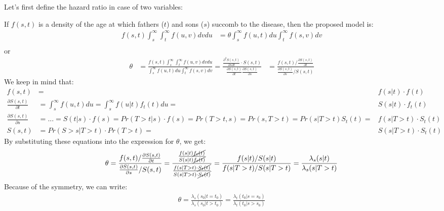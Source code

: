 \documentclass[]{article}
\begin{document}
Let's first define the hazard ratio in case of two variables:


If $f(s,t)$ is a density of the age at which fathers ($t$) and sons ($s$) succomb to the disease, then the proposed model is:
	$$
	\begin{aligned}
		f(s,t)\int_s^{\infty}\int_t^{\infty} f(u, v)dvdu &= \theta \int_s^{\infty}f(u, t)du\int_t^{\infty}f(s, v)dv \\
	\end{aligned}
	$$
		or\\
	$$
	\begin{aligned}
		\theta &= \frac{f(s,t)\int_s^{\infty}\int_t^{\infty} f(u, v)dvdu} {\int_s^{\infty}f(u, t)du\int_t^{\infty}f(s, v)dv} = 
		\frac{ \frac{\partial^2 S(s, t)}{\partial s\partial t} \cdot S(s, t)}    {\frac{\partial S(s, t)}{\partial t} \frac{\partial S(s, t)}{\partial s}}
		&= \frac{f(s,t)/\frac{\partial S(s, t)}{\partial t}}  {\frac{\partial S(s, t)}{\partial s}/ S(s, t) } 
	\end{aligned}
	$$
We keep in mind that:
	$$
	\begin{aligned}
		f(s,t) &= &f(s|t)\cdot f(t)\\
		\frac{\partial S(s,t)}{\partial t} &= \int_s^{\infty}f(u, t)du = \int_s^{\infty}f(u|t)f_t(t)du = &S(s|t)\cdot f_t(t)\\
		\frac{\partial S(s,t)}{\partial s} &=...= S(t|s)\cdot f(s) = Pr(T>t|s)\cdot f(s) = Pr(T>t, s) = Pr(s,T>t) = Pr(s|T>t)S_t(t) = &f(s|T>t)\cdot S_t(t)\\
		S(s,t) &= Pr(S>s|T>t)\cdot Pr(T>t) = &S(s|T>t)\cdot S_t(t)
	\end{aligned}
	$$
By substituting these equations into the expression for $\theta$, we get:
	$$
	\begin{aligned}
		\theta &= \frac{f(s,t)/\frac{\partial S(s, t)}{\partial t}}  {\frac{\partial S(s, t)}{\partial s}/ S(s, t) } = \frac{  \frac{f(s|t)\cancel{f_t(t)}}{S(s|t)\cancel{f_t(t)}} } { \frac{f(s|T>t)\cdot \cancel{S_t(t)}}{S(s|T>t)\cdot \cancel{S_t(t)}}  }
		  = \frac{f(s|t)/S(s|t)}     {f(s|T>t) / S(s|T>t) }
		= \frac{\lambda_s(s|t) } {\lambda_s(s|T>t) }\\
	\end{aligned}
	$$
Because of the symmetry, we can write:
	$$
	\begin{aligned}
	  \theta = \frac{ \lambda_s(s_0|t=t_0)}{\lambda_s(s_0|t>t_0)} = \frac{ \lambda_t(t_0|s=s_0)}{\lambda_t(t_0|s>s_0)}
	\end{aligned}
	$$
\end{document}
